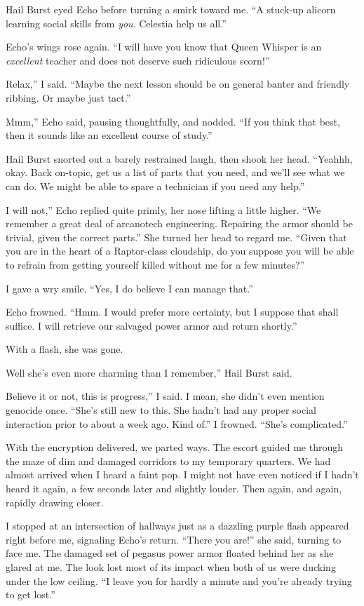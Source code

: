Hail Burst eyed Echo before turning a smirk toward me. “A stuck-up alicorn learning social skills from \textit{you}. Celestia help us all.”

Echo’s wings rose again. “I will have you know that Queen Whisper is an \textit{excellent} teacher and does not deserve such ridiculous scorn!”

\leavevmode{}Relax,” I said. “Maybe the next lesson should be on general banter and friendly ribbing. Or maybe just tact.”

\leavevmode{}Mmm,” Echo said, pausing thoughtfully, and nodded. “If you think that best, then it sounds like an excellent course of study.”

Hail Burst snorted out a barely restrained laugh, then shook her head. “Yeahhh, okay. Back on-topic, get us a list of parts that you need, and we’ll see what we can do. We might be able to spare a technician if you need any help.”

\leavevmode{}I will not,” Echo replied quite primly, her nose lifting a little higher. “We remember a great deal of arcanotech engineering. Repairing the armor should be trivial, given the correct parts.” She turned her head to regard me. “Given that you are in the heart of a Raptor-class cloudship, do you suppose you will be able to refrain from getting yourself killed without me for a few minutes?”

I gave a wry smile. “Yes, I do believe I can manage that.”

Echo frowned. “Hmm. I would prefer more certainty, but I suppose that shall suffice. I will retrieve our salvaged power armor and return shortly.”

With a flash, she was gone.

\leavevmode{}Well she’s even more charming than I remember,” Hail Burst said.

\leavevmode{}Believe it or not, this is progress,” I said. I mean, she didn’t even mention genocide once. “She’s still new to this. She hadn’t had any proper social interaction prior to about a week ago. Kind of.” I frowned. “She’s complicated.”

With the encryption delivered, we parted ways. The escort guided me through the maze of dim and damaged corridors to my temporary quarters. We had almost arrived when I heard a faint pop. I might not have even noticed if I hadn’t heard it again, a few seconds later and slightly louder. Then again, and again, rapidly drawing closer.

I stopped at an intersection of hallways just as a dazzling purple flash appeared right before me, signaling Echo’s return. “There you are!” she said, turning to face me. The damaged set of pegasus power armor floated behind her as she glared at me. The look lost most of its impact when both of us were ducking under the low ceiling. “I leave you for hardly a minute and you’re already trying to get lost.”

